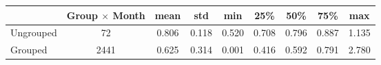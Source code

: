 \begin{tabular}{lcccccccc}
\toprule
{} &  Group $\times$ Month &   mean &    std &    min &    25\% &    50\% &    75\% &    max \\
\midrule
Ungrouped &                      72 &  0.806 &  0.118 &  0.520 &  0.708 &  0.796 &  0.887 &  1.135 \\
Grouped   &                    2441 &  0.625 &  0.314 &  0.001 &  0.416 &  0.592 &  0.791 &  2.780 \\
\bottomrule
\end{tabular}
